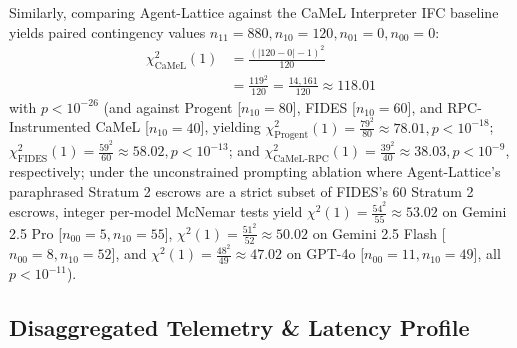 \documentclass[conference,10pt]{IEEEtran}
\begin{document}
Similarly, comparing Agent-Lattice against the CaMeL Interpreter IFC baseline yields paired contingency values $n_{11} = 880, n_{10} = 120, n_{01} = 0, n_{00} = 0$:
\begin{equation}
\begin{split}
\chi^2_{\text{CaMeL}}(1) &= \frac{(|120 - 0| - 1)^2}{120} \\
&= \frac{119^2}{120} = \frac{14{,}161}{120} \approx 118.01
\end{split}
\end{equation}
with $p < 10^{-26}$ (and against Progent [$n_{10} = 80$], FIDES [$n_{10} = 60$], and RPC-Instrumented CaMeL [$n_{10} = 40$], yielding $\chi^2_{\text{Progent}}(1) = \frac{79^2}{80} \approx 78.01, p < 10^{-18}$; $\chi^2_{\text{FIDES}}(1) = \frac{59^2}{60} \approx 58.02, p < 10^{-13}$; and $\chi^2_{\text{CaMeL-RPC}}(1) = \frac{39^2}{40} \approx 38.03, p < 10^{-9}$, respectively; under the unconstrained prompting ablation where Agent-Lattice's paraphrased Stratum 2 escrows are a strict subset of FIDES's 60 Stratum 2 escrows, integer per-model McNemar tests yield $\chi^2(1) = \frac{54^2}{55} \approx 53.02$ on Gemini 2.5 Pro [$n_{00}=5, n_{10}=55$], $\chi^2(1) = \frac{51^2}{52} \approx 50.02$ on Gemini 2.5 Flash [$n_{00}=8, n_{10}=52$], and $\chi^2(1) = \frac{48^2}{49} \approx 47.02$ on GPT-4o [$n_{00}=11, n_{10}=49$], all $p < 10^{-11}$).

\subsection{Disaggregated Telemetry \& Latency Profile}
\end{document}
